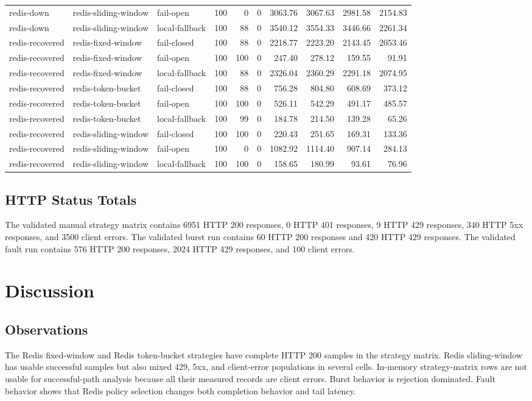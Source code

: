 \documentclass[conference]{IEEEtran}
\begin{document}
\begin{table}[t]
\begin{tabular}{lllrrrrrrr}
redis-down & redis-sliding-window & fail-open & 100 & 0 & 0 & 3063.76 & 3067.63 & 2981.58 & 2154.83 \\
redis-down & redis-sliding-window & local-fallback & 100 & 88 & 0 & 3540.12 & 3554.33 & 3446.66 & 2261.34 \\
redis-recovered & redis-fixed-window & fail-closed & 100 & 88 & 0 & 2218.77 & 2223.20 & 2143.45 & 2053.46 \\
redis-recovered & redis-fixed-window & fail-open & 100 & 100 & 0 & 247.40 & 278.12 & 159.55 & 91.91 \\
redis-recovered & redis-fixed-window & local-fallback & 100 & 88 & 0 & 2326.04 & 2360.29 & 2291.18 & 2074.95 \\
redis-recovered & redis-token-bucket & fail-closed & 100 & 88 & 0 & 756.28 & 804.80 & 608.69 & 373.12 \\
redis-recovered & redis-token-bucket & fail-open & 100 & 100 & 0 & 526.11 & 542.29 & 491.17 & 485.57 \\
redis-recovered & redis-token-bucket & local-fallback & 100 & 99 & 0 & 184.78 & 214.50 & 139.28 & 65.26 \\
redis-recovered & redis-sliding-window & fail-closed & 100 & 100 & 0 & 220.43 & 251.65 & 169.31 & 133.36 \\
redis-recovered & redis-sliding-window & fail-open & 100 & 0 & 0 & 1082.92 & 1114.40 & 907.14 & 284.13 \\
redis-recovered & redis-sliding-window & local-fallback & 100 & 100 & 0 & 158.65 & 180.99 & 93.61 & 76.96 \\
\hline
\end{tabular}
\end{table}

\subsection{HTTP Status Totals}
The validated manual strategy matrix contains 6951 HTTP 200 responses, 0 HTTP 401 responses, 9 HTTP 429 responses, 340 HTTP 5xx responses, and 3500 client errors. The validated burst run contains 60 HTTP 200 responses and 420 HTTP 429 responses. The validated fault run contains 576 HTTP 200 responses, 2024 HTTP 429 responses, and 100 client errors.

\section{Discussion}
\subsection{Observations}
The Redis fixed-window and Redis token-bucket strategies have complete HTTP 200 samples in the strategy matrix. Redis sliding-window has usable successful samples but also mixed 429, 5xx, and client-error populations in several cells. In-memory strategy-matrix rows are not usable for successful-path analysis because all their measured records are client errors. Burst behavior is rejection dominated. Fault behavior shows that Redis policy selection changes both completion behavior and tail latency.
\end{document}
